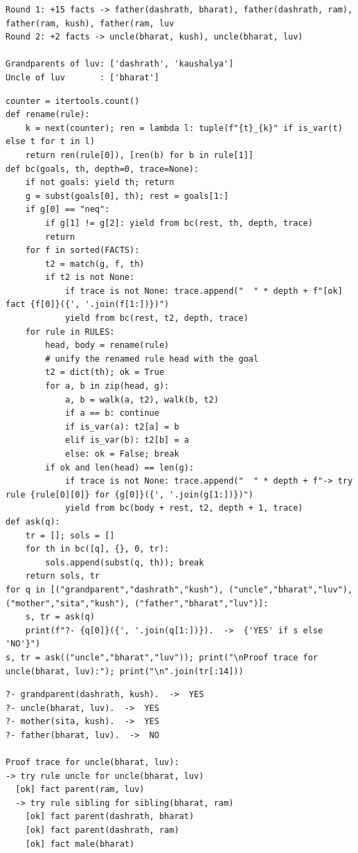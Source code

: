 \documentclass[11pt]{article}
\begin{document}
\begin{lstlisting}[style=out]
Round 1: +15 facts -> father(dashrath, bharat), father(dashrath, ram), father(ram, kush), father(ram, luv
Round 2: +2 facts -> uncle(bharat, kush), uncle(bharat, luv)

Grandparents of luv: ['dashrath', 'kaushalya']
Uncle of luv       : ['bharat']
\end{lstlisting}
\begin{lstlisting}[style=py]
counter = itertools.count()
def rename(rule):
    k = next(counter); ren = lambda l: tuple(f"{t}_{k}" if is_var(t) else t for t in l)
    return ren(rule[0]), [ren(b) for b in rule[1]]
def bc(goals, th, depth=0, trace=None):
    if not goals: yield th; return
    g = subst(goals[0], th); rest = goals[1:]
    if g[0] == "neq":
        if g[1] != g[2]: yield from bc(rest, th, depth, trace)
        return
    for f in sorted(FACTS):
        t2 = match(g, f, th)
        if t2 is not None:
            if trace is not None: trace.append("  " * depth + f"[ok] fact {f[0]}({', '.join(f[1:])})")
            yield from bc(rest, t2, depth, trace)
    for rule in RULES:
        head, body = rename(rule)
        # unify the renamed rule head with the goal
        t2 = dict(th); ok = True
        for a, b in zip(head, g):
            a, b = walk(a, t2), walk(b, t2)
            if a == b: continue
            if is_var(a): t2[a] = b
            elif is_var(b): t2[b] = a
            else: ok = False; break
        if ok and len(head) == len(g):
            if trace is not None: trace.append("  " * depth + f"-> try rule {rule[0][0]} for {g[0]}({', '.join(g[1:])})")
            yield from bc(body + rest, t2, depth + 1, trace)
def ask(q):
    tr = []; sols = []
    for th in bc([q], {}, 0, tr):
        sols.append(subst(q, th)); break
    return sols, tr
for q in [("grandparent","dashrath","kush"), ("uncle","bharat","luv"), ("mother","sita","kush"), ("father","bharat","luv")]:
    s, tr = ask(q)
    print(f"?- {q[0]}({', '.join(q[1:])}).  ->  {'YES' if s else 'NO'}")
s, tr = ask(("uncle","bharat","luv")); print("\nProof trace for uncle(bharat, luv):"); print("\n".join(tr[:14]))
\end{lstlisting}
\begin{lstlisting}[style=out]
?- grandparent(dashrath, kush).  ->  YES
?- uncle(bharat, luv).  ->  YES
?- mother(sita, kush).  ->  YES
?- father(bharat, luv).  ->  NO

Proof trace for uncle(bharat, luv):
-> try rule uncle for uncle(bharat, luv)
  [ok] fact parent(ram, luv)
  -> try rule sibling for sibling(bharat, ram)
    [ok] fact parent(dashrath, bharat)
    [ok] fact parent(dashrath, ram)
    [ok] fact male(bharat)
\end{lstlisting}
\end{document}
